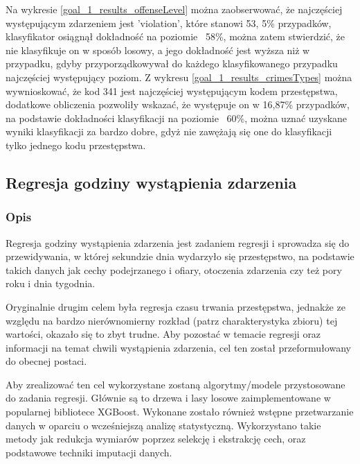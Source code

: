 \documentclass{classrep}
\begin{document}
{{{                Na wykresie \ref{goal_1_results_offenseLevel} można zaobserwować, że
                najczęściej występującym zdarzeniem jest 'violation', które stanowi 53,
                5\% przypadków, klasyfikator osiągnął dokładność na poziomie ~58\%,
                można zatem stwierdzić, że nie klasyfikuje on w sposób losowy, a jego
                dokładność jest wyższa niż w przypadku, gdyby przyporządkowywał do
                każdego klasyfikowanego przypadku najczęściej występujący poziom.
                Z wykresu \ref{goal_1_results_crimesTypes} można wywnioskować, że kod
                341 jest najczęściej występującym kodem przestępstwa, dodatkowe
                obliczenia pozwoliły wskazać, że występuje on w 16,87\% przypadków, na
                podstawie dokładności klasyfikacji na poziomie ~60\%, można uznać
                uzyskane wyniki klasyfikacji za bardzo dobre, gdyż nie zawężają się one
                do klasyfikacji tylko jednego kodu przestępstwa.
            }
        }
        \clearpage

        \subsection{Regresja godziny wystąpienia zdarzenia} \label{project_goal_2} {
        
            \subsubsection{Opis} {
                Regresja godziny wystąpienia zdarzenia jest zadaniem regresji i
                sprowadza się do przewidywania, w której sekundzie dnia wydarzyło się
                przestępstwo, na podstawie takich danych jak cechy podejrzanego i
                ofiary, otoczenia zdarzenia czy też pory roku i dnia tygodnia.

                Oryginalnie drugim celem była regresja czasu trwania przestępstwa,
                jednakże ze względu na bardzo nierównomierny rozkład (patrz
                charakterystyka zbioru) tej wartości, okazało się to zbyt trudne. Aby
                pozostać w temacie regresji oraz informacji na temat chwili wystąpienia
                zdarzenia, cel ten został przeformułowany do obecnej postaci.

                Aby zrealizować ten cel wykorzystane zostaną algorytmy/modele
                przystosowane do zadania regresji. Głównie są to drzewa i lasy losowe
                zaimplementowane w popularnej bibliotece XGBoost. Wykonane zostało
                również wstępne przetwarzanie danych w oparciu o wcześniejszą analizę
                statystyczną. Wykorzystano takie metody jak redukcja wymiarów poprzez
                selekcję i ekstrakcję cech, oraz podstawowe techniki imputacji danych.
            }

}}
\end{document}
